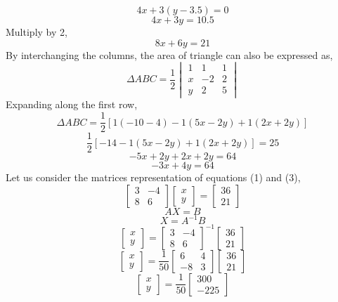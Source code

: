 \documentclass[journal,12pt,twocolumn]{IEEEtran}
\begin{document}
$$4x+3(y-3.5)=0$$
$$4x+3y=10.5$$
Multiply by 2,
\begin{equation}
 8x+6y=21    
\end{equation}
\noindent
By interchanging the columns, the area of triangle can also be expressed as,
$$\Delta ABC=\frac{1}{2}\begin{vmatrix}
1 & 1 & 1\\ 
x & -2 & 2\\ 
y & 2 & 5
\end{vmatrix}$$
\noindent
Expanding along the first row,\\
$$\Delta ABC=\frac{1}{2}\left [ 1(-10-4)-1(5x-2y)+1(2x+2y) \right ]$$
$$\frac{1}{2}\left [-14-1(5x-2y)+1(2x+2y) \right ]=25$$
$$-5x+2y+2x+2y=64$$
\begin{equation}
 -3x+4y=64    
\end{equation}
Let us consider the matrices representation of equations (1) and (3),
\[
\begin{bmatrix}
3 & -4 \\
8 & 6 
\end{bmatrix}
\begin{bmatrix}
x \\ y
\end{bmatrix}
=
\begin{bmatrix}
36 \\ 21
\end{bmatrix}
\]
$$AX=B$$
$$X= A^{-1}B$$
\[
\begin{bmatrix}
x \\ y
\end{bmatrix}
=
\begin{bmatrix}
3 & -4 \\
8 & 6 
\end{bmatrix}^{-1}
\begin{bmatrix}
36 \\ 21
\end{bmatrix}
\]
\[
\begin{bmatrix}
x \\ y
\end{bmatrix}
=
\frac{1}{50}
\begin{bmatrix}
6 & 4 \\
-8 & 3 
\end{bmatrix}
\begin{bmatrix}
36 \\ 21
\end{bmatrix}
\]
\[
\begin{bmatrix}
x \\ y
\end{bmatrix}
=
\frac{1}{50}
\begin{bmatrix}
300 \\ -225
\end{bmatrix}
\]
\end{document}

